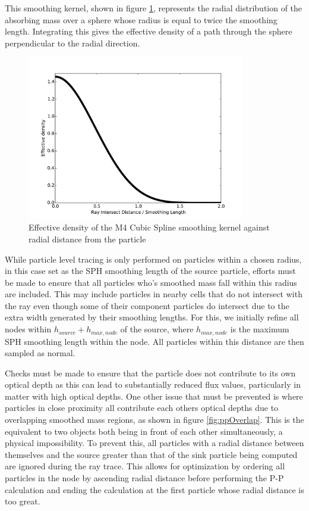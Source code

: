 This smoothing kernel, shown in figure \ref{smoothingKernel}, represents the radial distribution of the absorbing mass over a sphere whose radius is equal to twice the smoothing length. Integrating this gives the effective density of a path through the sphere perpendicular to the radial direction. 
\begin{figure}[H]
    \centering
    \includegraphics[width=0.85\textwidth]{plots/CH3/kernelPlot.pdf}
    \caption{Effective density of the M4 Cubic Spline smoothing kernel against radial distance from the particle}
    \label{smoothingKernel}
\end{figure}

While particle level tracing is only performed on particles within a chosen radius, in this case set as the SPH smoothing length of the source particle, efforts must be made to ensure that all particles who's smoothed mass fall within this radius are included. This may include particles in nearby cells that do not intersect with the ray even though some of their component particles do intersect due to the extra width generated by their smoothing lengths. For this, we initially refine all nodes within $h_{source} + h_{max, node}$ of the source, where $h_{max, node}$ is the maximum SPH smoothing length within the node. All particles within this distance are then sampled as normal.

Checks must be made to ensure that the particle does not contribute to its own optical depth as this can lead to substantially reduced flux values, particularly in matter with high optical depths. One other issue that must be prevented is where particles in close proximity all contribute each others optical depths due to overlapping smoothed mass regions, as shown in figure \ref{fig:ppOverlap}. This is the equivalent to two objects both being in front of each other simultaneously, a physical impossibility. To prevent this, all particles with a radial distance between themselves and the source greater than that of the sink particle being computed are ignored during the ray trace. This allows for optimization by ordering all particles in the node by ascending radial distance before performing the P-P calculation and ending the calculation at the first particle whose radial distance is too great. 

